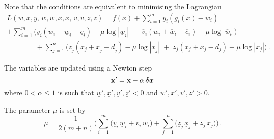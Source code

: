 \documentclass[11pt,a4paper]{article}
\newcommand{\unl}[1]{{\ \!\underline{\;\!\!#1\;\!\!}\ \!}}
\renewcommand{\unl}[1]{{\underline{#1}}}
\newcommand{\ovl}[1]{{\bar{#1}}}
\renewcommand{\ovl}[1]{{\overline{#1}}}
\newcommand{\cl}{{\underline{c}}}
\newcommand{\dl}{{\underline{d}}}
\newcommand{\vl}{{\unl{v}}}
\newcommand{\wl}{{\unl{w}}}
\newcommand{\xl}{{\unl{x}}}
\newcommand{\zl}{{\unl{z}}}
\newcommand{\cu}{{\overline{c}}}
\newcommand{\du}{{\overline{d}}}
\newcommand{\vu}{{\ovl{v}}}
\newcommand{\wu}{{\ovl{w}}}
\newcommand{\xu}{{\ovl{x}}}
\newcommand{\zu}{{\ovl{z}}}
\newcommand{\w}{w}
\newcommand{\x}{x}
\newcommand{\y}{y}
\begin{document}
Note that the conditions are equivalent to minimising the Lagrangian
\begin{multline*} L(\w,\x,\y,\,\wl,\wu,\xl,\xu,\,\vl,\vu,\zl,\zu) = f(\x) + \sum_{i=1}^{m} \y_i(g_i(\x)-\w_i) \\
     + \sum_{i=1}^{m} \bigl(  \vl_i(\w_i+\wl_i-\cl_i)\!-\!\mu\log\!|\wl_i| \;+\; \vu_i(\w_i+\wu_i-\cu_i)\!-\!\mu\log\!|\wu_i| \bigr) \\
     \qquad\qquad + \sum_{j=1}^{n} \bigl(  \zl_j(\x_j+\xl_j-\dl_j)\!-\!\mu\log\!|\xl_j| \;+\; \zu_j(\x_j+\xu_j-\du_j)\!-\!\mu\log\!|\xu_j| \bigr) \,. \end{multline*}

The variables are updated using a Newton step
\[ \mathbf{x}' = \mathbf{x} - \alpha \, \mbox{\boldmath$\delta x$} \]
where $0<\alpha\leq 1$ is such that $\wl',\xl',\vl',\zl' < 0$ and $\wu',\xu',\vu',\zu'>0$.

The parameter $\mu$ is set by
\[  \mu = \frac{1}{2(m+n)} \biggl( \sum_{i=1}^{m}\bigl(\vl_i\,\wl_i+\vu_i\,\wu_i\bigr) + \sum_{j=1}^{n}\bigl(\zl_j\,\xl_j+\zu_j\,\xu_j\bigr) \biggr) . \]
\end{document}
